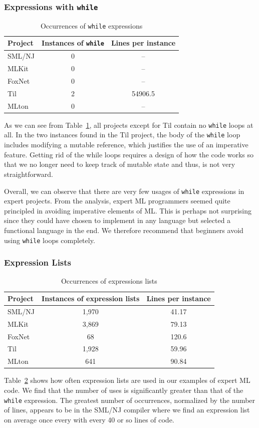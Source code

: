 \documentclass[12pt,abstracton]{scrartcl}
\begin{document}
\subsubsection{Expressions with \texttt{while}}
\begin{table}[h!]
\centering
\begin{tabular}{|l||c|c|}
\hline
Project & Instances of \texttt{while} & Lines per instance \\ \hline\hline
SML/NJ & 0 & --\\
MLKit & 0 & --\\
FoxNet & 0 & -- \\
Til & 2 & 54906.5 \\
MLton & 0 & --\\ \hline
\end{tabular}
\caption{Occurrences of \texttt{while} expressions}
\label{table:while}
\end{table}
As we can see from Table~\ref{table:while}, all projects except for Til
contain no \texttt{while} loops at all.
In the two instances found in the Til project, the body of the \texttt{while}
loop includes modifying a mutable reference, which justifies the use of
an imperative feature. Getting rid of the while loops requires a design of how the code works so
that we no longer need to keep track of mutable state and thus, is not very straightforward.

Overall, we can observe that there are very few usages of \texttt{while} expressions
in expert projects.
From the analysis, expert ML programmers seemed quite principled in avoiding imperative
elements of ML. This is perhaps not surprising since they could have chosen
to implement in any language but selected a functional language in the end.
We therefore recommend that beginners avoid using \texttt{while} loops completely.
\subsubsection{Expression Lists}
\begin{table}[h!]
\centering
\begin{tabular}{|l||c|c|}
\hline
Project & Instances of expression lists & Lines per instance \\ \hline\hline
SML/NJ & 1,970 & 41.17 \\
MLKit & 3,869 & 79.13 \\
FoxNet & 68 & 120.6 \\
Til & 1,928 & 59.96 \\
MLton & 641 & 90.84 \\ \hline
\end{tabular}
\caption{Occurrences of expressions lists}
\label{table:explist}
\end{table}
Table~\ref{table:explist} shows how often expression lists are used in our
examples of expert ML code. We find that the number of uses is significantly
greater than that of the \texttt{while} expression. The greatest number
of occurrences, normalized by the number of lines, appears to be in the SML/NJ
compiler where we find an expression list on average once every with every
40 or so lines of code.
\end{document}

